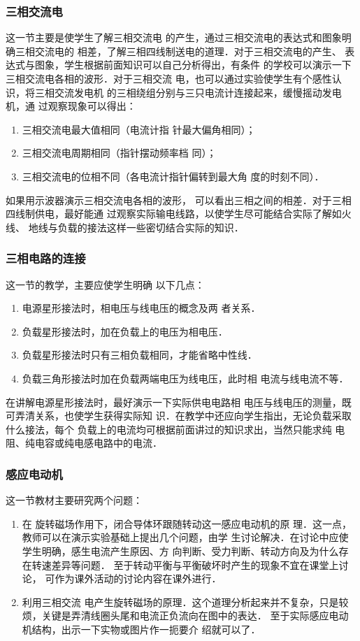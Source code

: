 \subsubsection{三相交流电}

这一节主要是使学生了解三相交流电
的产生，通过三相交流电的表达式和图象明确三相交流电的
相差，了解三相四线制送电的道理．对于三相交流电的产生、
表达式与图象，学生根据前面知识可以自己分析得出，有条件
的学校可以演示一下三相交流电各相的波形．对于三相交流
电，也可以通过实验使学生有个感性认识，将三相交流发电机
的三相绕组分别与三只电流计连接起来，缓慢摇动发电机，通
过观察现象可以得出：
\begin{enumerate}
  \item 三相交流电最大值相同（电流计指
针最大偏角相同）；
\item 三相交流电周期相同（指针摆动频率档
同）；
\item 三相交流电的位相不同（各电流计指针偏转到最大角
度的时刻不同）．
\end{enumerate}
如果用示波器演示三相交流电各相的波形，
可以看出三相之间的相差．对于三相四线制供电，最好能通
过观察实际输电线路，以使学生尽可能结合实际了解如火线、
地线与负载的接法这样一些密切结合实际的知识．

\subsubsection{三相电路的连接}

这一节的教学，主要应使学生明确
以下几点：
\begin{enumerate}
\item 电源星形接法时，相电压与线电压的概念及两
者关系．    \item 负载星形接法时，加在负载上的电压为相电压．
\item 负载星形接法时只有三相负载相同，才能省略中性线．
\item 负载三角形接法时加在负载两端电压为线电压，此时相
电流与线电流不等．
\end{enumerate}

在讲解电源星形接法时，最好演示一下实际供电电路相
电压与线电压的测量，既可弄清关系，也使学生获得实际知
识．在教学中还应向学生指出，无论负载采取什么接法，每个
负载上的电流均可根据前面讲过的知识求出，当然只能求纯
电阻、纯电容或纯电感电路中的电流．

\subsubsection{感应电动机}

这一节教材主要研究两个问题：
\begin{enumerate}
\item 在
旋转磁场作用下，闭合导体环跟随转动这一感应电动机的原
理．这一点，教师可以在演示实验基础上提出几个问题，由学
生讨论解决．在讨论中应使学生明确，感生电流产生原因、方
向判断、受力判断、转动方向及为什么存在转速差异等问题．
至于转动平衡与平衡破坏时产生的现象不宜在课堂上讨论，
可作为课外活动的讨论内容在课外进行．
\item 利用三相交流
电产生旋转磁场的原理．这个道理分析起来并不复杂，只是较烦，关键是弄清线圈头尾和电流正负流向在图中的表达．
至于实际感应电动机结构，出示一下实物或图片作一扼要介
绍就可以了．
\end{enumerate}

